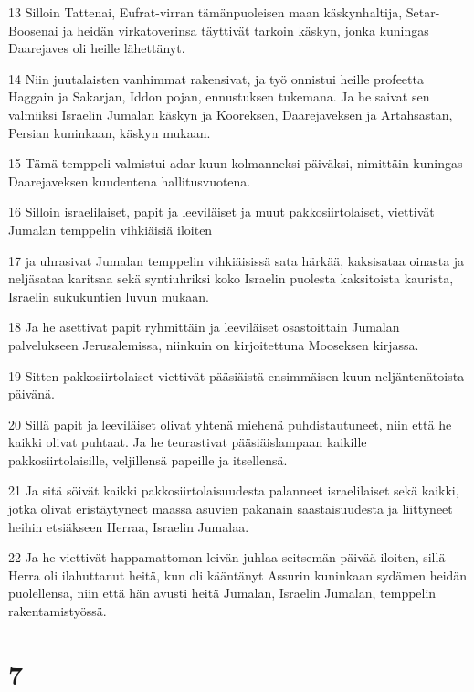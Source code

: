 \par 13 Silloin Tattenai, Eufrat-virran tämänpuoleisen maan käskynhaltija, Setar-Boosenai ja heidän virkatoverinsa täyttivät tarkoin käskyn, jonka kuningas Daarejaves oli heille lähettänyt.
\par 14 Niin juutalaisten vanhimmat rakensivat, ja työ onnistui heille profeetta Haggain ja Sakarjan, Iddon pojan, ennustuksen tukemana. Ja he saivat sen valmiiksi Israelin Jumalan käskyn ja Kooreksen, Daarejaveksen ja Artahsastan, Persian kuninkaan, käskyn mukaan.
\par 15 Tämä temppeli valmistui adar-kuun kolmanneksi päiväksi, nimittäin kuningas Daarejaveksen kuudentena hallitusvuotena.
\par 16 Silloin israelilaiset, papit ja leeviläiset ja muut pakkosiirtolaiset, viettivät Jumalan temppelin vihkiäisiä iloiten
\par 17 ja uhrasivat Jumalan temppelin vihkiäisissä sata härkää, kaksisataa oinasta ja neljäsataa karitsaa sekä syntiuhriksi koko Israelin puolesta kaksitoista kaurista, Israelin sukukuntien luvun mukaan.
\par 18 Ja he asettivat papit ryhmittäin ja leeviläiset osastoittain Jumalan palvelukseen Jerusalemissa, niinkuin on kirjoitettuna Mooseksen kirjassa.
\par 19 Sitten pakkosiirtolaiset viettivät pääsiäistä ensimmäisen kuun neljäntenätoista päivänä.
\par 20 Sillä papit ja leeviläiset olivat yhtenä miehenä puhdistautuneet, niin että he kaikki olivat puhtaat. Ja he teurastivat pääsiäislampaan kaikille pakkosiirtolaisille, veljillensä papeille ja itsellensä.
\par 21 Ja sitä söivät kaikki pakkosiirtolaisuudesta palanneet israelilaiset sekä kaikki, jotka olivat eristäytyneet maassa asuvien pakanain saastaisuudesta ja liittyneet heihin etsiäkseen Herraa, Israelin Jumalaa.
\par 22 Ja he viettivät happamattoman leivän juhlaa seitsemän päivää iloiten, sillä Herra oli ilahuttanut heitä, kun oli kääntänyt Assurin kuninkaan sydämen heidän puolellensa, niin että hän avusti heitä Jumalan, Israelin Jumalan, temppelin rakentamistyössä.

\chapter{7}

